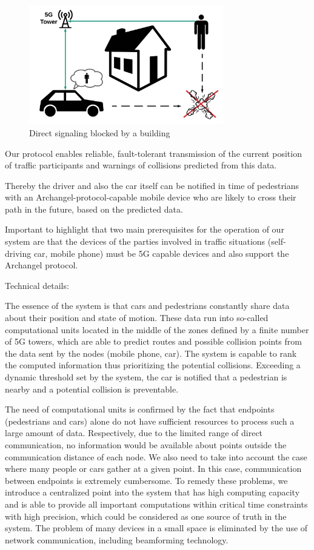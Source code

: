 \documentclass[conference]{IEEEtran}
\begin{document}
\begin{figure}[h]
    \centering
    \includegraphics[width=8.5cm]{./pics/Corner.png}
    \caption{Direct signaling blocked by a building}
\end{figure}

Our protocol enables reliable, fault-tolerant transmission of the current position of traffic participants and warnings of collisions predicted from this data.

Thereby the driver and also the car itself can be notified in time of pedestrians with an Archangel-protocol-capable mobile device who are likely to cross their path in the future, based on the predicted data.

Important to highlight that two main prerequisites for the operation of our system are that the devices of the parties involved in traffic situations (self-driving car, mobile phone) must be 5G capable devices and also support the Archangel protocol.

Technical details:

The essence of the system is that cars and pedestrians constantly share data about their position and state of motion. These data run into so-called computational units located in the middle of the zones defined by a finite number of 5G towers, which are able to predict routes and possible collision points from the data sent by the nodes (mobile phone, car). The system is capable to rank the computed information thus prioritizing the potential collisions. Exceeding a dynamic threshold set by the system, the car is notified that a pedestrian is nearby and a potential collision is preventable.

The need of computational units is confirmed by the fact that endpoints (pedestrians and cars) alone do not have sufficient resources to process such a large amount of data. Respectively, due to the limited range of direct communication, no information would be available about points outside the communication distance of each node. We also need to take into account the case where many people or cars gather at a given point. In this case, communication between endpoints is extremely cumbersome. To remedy these problems, we introduce a centralized point into the system that has high computing capacity and is able to provide all important computations within critical time constraints with high precision, which could be considered as one source of truth in the system. The problem of many devices in a small space is eliminated by the use of network communication, including beamforming technology.
\end{document}
